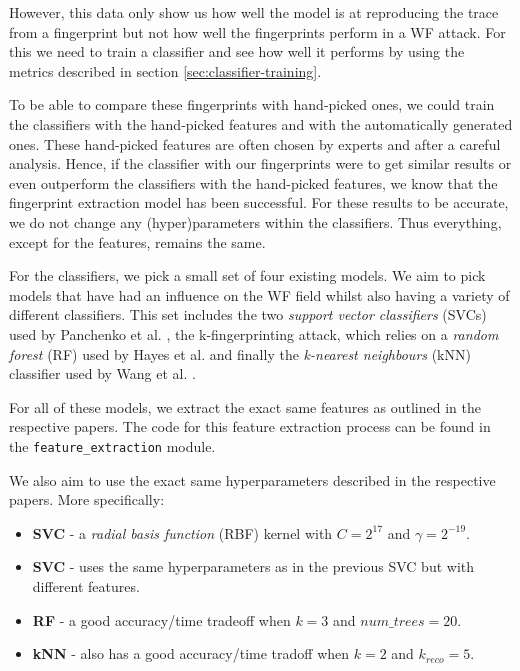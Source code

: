 However, this data only show us how well the model is at reproducing the trace from a fingerprint but not how well the fingerprints perform in a WF attack.
For this we need to train a classifier and see how well it performs by using the metrics described in section \ref{sec:classifier-training}.

To be able to compare these fingerprints with hand-picked ones, we could train the classifiers with the hand-picked features and with the automatically generated ones.
These hand-picked features are often chosen by experts and after a careful analysis.
Hence, if the classifier with our fingerprints were to get similar results or even outperform the classifiers with the hand-picked features, we know that the fingerprint extraction model has been successful.
For these results to be accurate, we do not change any (hyper)parameters within the classifiers.
Thus everything, except for the features, remains the same.

For the classifiers, we pick a small set of four existing models.
We aim to pick models that have had an influence on the WF field whilst also having a variety of different classifiers.
This set includes the two \textit{support vector classifiers} (SVCs) used by Panchenko et al. \cite{panchenko1,panchenko2},
the k-fingerprinting attack, which relies on a \textit{random forest} (RF) used by Hayes et al. \cite{kfingerprinting}
and finally the \textit{k-nearest neighbours} (kNN) classifier used by Wang et al. \cite{wang_cai_johnson_nithyanand_goldberg_2014}.

For all of these models, we extract the exact same features as outlined in the respective papers.
The code for this feature extraction process can be found in the \texttt{feature\_extraction} module.

We also aim to use the exact same hyperparameters described in the respective papers. More specifically:
\begin{itemize}
  \item \textbf{SVC} \cite{panchenko1} - a \textit{radial basis function} (RBF) kernel with $C = 2^{17}$ and $\gamma = 2^{-19}$.
  \item \textbf{SVC} \cite{panchenko2} - uses the same hyperparameters as in the previous SVC but with different features.
  \item \textbf{RF} \cite{kfingerprinting} - a good accuracy/time tradeoff when $k = 3$ and $\textit{num\_trees} = 20$.
  \item \textbf{kNN} \cite{wang_cai_johnson_nithyanand_goldberg_2014} - also has a good accuracy/time tradoff when $k = 2$ and $k_{\textit{reco}} = 5$.
\end{itemize}

